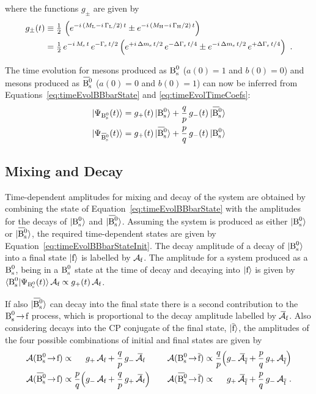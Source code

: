 where the functions $g_\pm$ are given by
\begin{align}
  \label{eq:timeEvolQp}
  g_\pm(t) &\equiv \tfrac{1}{2}\, \left( e^{-i\,(M_\text{L}-i\,\Gamma_\text{L}/2)\,t} \pm e^{-i\,(M_\text{H}-i\,\Gamma_\text{H}/2)\,t} \right) \\
           &= \tfrac{1}{2}\, e^{-i\,M_\text{s}\,t}\, e^{-\Gamma_\text{s}\,t/2}
                \left( e^{+i\,\Delta m_\text{s}\,t/2}\, e^{-\Delta\Gamma_\text{s}\,t/4} \pm e^{-i\,\Delta m_\text{s}\,t/2}\, e^{+\Delta\Gamma_\text{s}\,t/4} \right) \nonumber
           \ .
\end{align}

The time evolution for mesons produced as $\text{B}_\text{s}^\text{0}$ ($a(0)=1$ and $b(0)=0$) and mesons produced as $\Bsbar$ ($a(0)=0$ and $b(0)=1$) can now be
inferred from Equations~\ref{eq:timeEvolBBbarState} and \ref{eq:timeEvolTimeCoefs}:
\begin{subequations}
  \label{eq:timeEvolBBbarStateInit}
  \begin{align}
    |\Psi_{\Bs}(t)\rangle    = g_+(t)\,\Bsst    + \qp\,g_-(t)\,\Bsbarst \\
    |\Psi_{\Bsbar}(t)\rangle = g_+(t)\,\Bsbarst + \pq\,g_-(t)\,\Bsst
  \end{align}
\end{subequations}

\subsection{Mixing and Decay}
\label{sec:pheno_mix_decay}

Time-dependent amplitudes for mixing and decay of the \BsBsbar{} system are obtained by combining the state of
Equation~\ref{eq:timeEvolBBbarState} with the amplitudes for the decays of $|\text{B}_\text{s}^\text{0}\rangle$ and $\Bsbarst$. Assuming the system is produced as
either $|\text{B}_\text{s}^\text{0}\rangle$ or $\Bsbarst$, the required time-dependent states are given by Equation~\ref{eq:timeEvolBBbarStateInit}. The decay amplitude
of a decay of $|\text{B}_\text{s}^\text{0}\rangle$ into a final state $|\text{f}\rangle$ is labelled by $\mathcal{A}_{\text{f}}$. The amplitude for a system produced as a $\text{B}_\text{s}^\text{0}$, being in a $\text{B}_\text{s}^\text{0}$
state at the time of decay and decaying into $|\text{f}\rangle$ is given by $\langle\text{B}_\text{s}^\text{0}|\Psi_{\text{B}_\text{s}^\text{0}}(t)\rangle\,\mathcal{A}_{\text{f}} \propto g_+(t)\,\mathcal{A}_{\text{f}}$.

If also $\Bsbarst$ can decay into the final state there is a second contribution to the $\text{B}_\text{s}^\text{0}\!\to\!{\text{f}}$ process, which is proportional to the
decay amplitude labelled by $\kern 0.23em \overline{\kern -0.23em \mathcal{A}}_{\text{f}}$. Also considering decays into the CP conjugate of the final state, $|\overline{\text{f}}\rangle$, the amplitudes of the
four possible combinations of initial and final states are given by
\begin{equation}
  \label{eq:mixDecayAmps}
  \begin{alignedat}{4}
    \mathcal{A}(\Bstof) &\propto& & g_+\, \Af + \qp\, g_-\, \Abarf &
    \qquad
    \mathcal{A}(\Bstofbar) &\propto& \;\qp \Big( & g_-\, \Abarfbar + \pq\, g_+\, \Afbar \Big)
    \\
    \mathcal{A}(\Bsbartof) &\propto& \;\pq \Big( & g_-\, \Af + \qp\, g_+\, \Abarf \Big) &
    \mathcal{A}(\Bsbartofbar) &\propto& & g_+\, \Abarfbar + \pq\, g_-\, \Afbar
    \ .
  \end{alignedat}
\end{equation}

